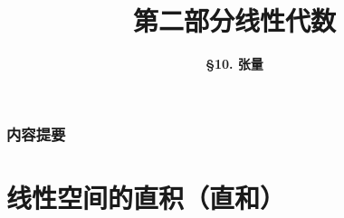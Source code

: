 



\title[Linear Algebra]{\LARGE \bfseries 第二部分\quad 线性代数} %
\author[Tensor] %
{\Large \bfseries \S 10. 张量}
\date{}





\begin{frame}

\titlepage %

\end{frame}


\begin{frame}
\frametitle{内容提要} %
\tableofcontents %
\end{frame}



\section{线性空间的直积（直和）}



